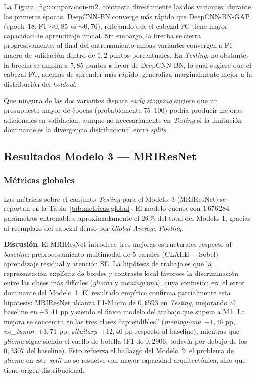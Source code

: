 La Figura~\ref{fig:comparacion-m2} contrasta directamente las
dos variantes: durante las primeras épocas, DeepCNN-BN converge
más rápido que DeepCNN-BN-GAP (epoch~$18$: F1
$\sim 0{,}85$ vs $\sim 0{,}76$), reflejando que el cabezal FC
tiene mayor capacidad de aprendizaje inicial. Sin embargo, la
brecha se cierra progresivamente: al final del entrenamiento
ambas variantes convergen a F1-macro de validación dentro de
$1{,}2$ puntos porcentuales. En \textit{Testing}, no obstante,
la brecha se amplía a $7{,}85$ puntos a favor de DeepCNN-BN,
lo cual sugiere que el cabezal FC, además de aprender más
rápido, generaliza marginalmente mejor a la distribución del
\textit{holdout}.

Que ninguna de las dos variantes dispare \textit{early
stopping} sugiere que un presupuesto mayor de épocas
(probablemente $75$--$100$) podría producir mejoras
adicionales en validación, aunque no necesariamente en
\textit{Testing} si la limitación dominante es la divergencia
distribucional entre \textit{splits}.

\subsection{Resultados Modelo 3 --- MRIResNet}
\label{sec:resultados-m3}

\subsubsection*{Métricas globales}

Las métricas sobre el conjunto \textit{Testing} para el Modelo~3
(MRIResNet) se reportan en la Tabla~\ref{tab:metricas-global}.
El modelo cuenta con $1\,676\,284$ parámetros entrenables,
aproximadamente el $26$\,\% del total del Modelo~1, gracias al
reemplazo del cabezal denso por \textit{Global Average Pooling}.

\noindent\textbf{Discusión.}
El MRIResNet introduce tres mejoras estructurales respecto al
\textit{baseline}: preprocesamiento multimodal de 5 canales
(CLAHE + Sobel), aprendizaje residual y atención SE.
La hipótesis de trabajo es que la representación explícita de
bordes y contraste local favorece la discriminación entre las
clases más difíciles (\textit{glioma} y \textit{meningioma}),
cuya confusión era el error dominante del Modelo~1.
El resultado empírico confirma parcialmente esta hipótesis:
MRIResNet alcanza F1-Macro de $0{,}6593$ en \textit{Testing},
mejorando al baseline en $+3{,}41$ pp y siendo el único modelo
del trabajo que supera a M1.
La mejora se concentra en las tres clases ``aprendibles''
(\textit{meningioma}~$+1{,}46$ pp, \textit{no\_tumor}~$+3{,}71$
pp, \textit{pituitary}~$+12{,}46$ pp respecto al baseline),
mientras que \textit{glioma} sigue siendo el cuello de botella
(F1 de $0{,}2906$, todavía por debajo de los $0{,}3307$ del
baseline). Esto refuerza el hallazgo del Modelo~2: el problema
de \textit{glioma} en este \textit{split} no se resuelve con
mayor capacidad arquitectónica, sino que tiene origen
distribucional.

